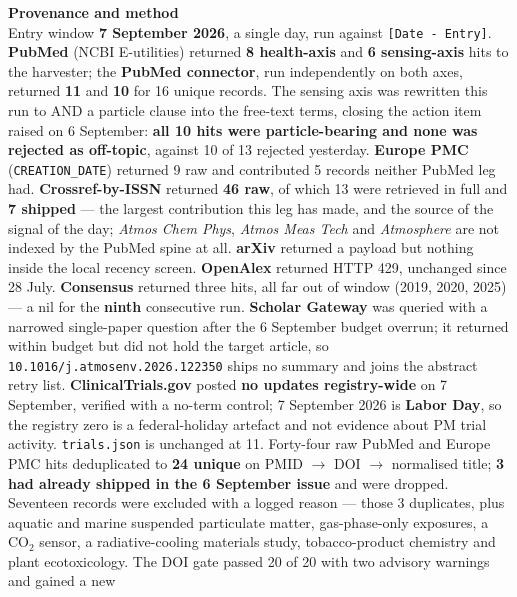 \documentclass[10pt]{article}
\begin{document}
\vspace{4mm}
\begin{keybox}
{\sffamily\bfseries\footnotesize\color{Deep}Provenance and method}\\[1.2mm]
{\fontsize{7.2}{8.8}\selectfont
Entry window \textbf{7 September 2026}, a single day, run against \texttt{[Date - Entry]}.
\textbf{PubMed} (NCBI E-utilities) returned \textbf{8 health-axis} and \textbf{6
sensing-axis} hits to the harvester; the \textbf{PubMed connector}, run independently on both
axes, returned \textbf{11} and \textbf{10} for 16 unique records. The sensing axis was
rewritten this run to AND a particle clause into the free-text terms, closing the action item
raised on 6 September: \textbf{all 10 hits were particle-bearing and none was rejected as
off-topic}, against 10 of 13 rejected yesterday. \textbf{Europe PMC}
(\texttt{CREATION\_DATE}) returned 9 raw and contributed 5 records neither PubMed leg had.
\textbf{Crossref-by-ISSN} returned \textbf{46 raw}, of which 13 were retrieved in full and
\textbf{7 shipped} --- the largest contribution this leg has made, and the source of the
signal of the day; \textit{Atmos Chem Phys}, \textit{Atmos Meas Tech} and \textit{Atmosphere}
are not indexed by the PubMed spine at all. \textbf{arXiv} returned a payload but nothing
inside the local recency screen. \textbf{OpenAlex} returned HTTP 429, unchanged since 28 July.
\textbf{Consensus} returned three hits, all far out of window (2019, 2020, 2025) --- a nil for
the \textbf{ninth} consecutive run. \textbf{Scholar Gateway} was queried with a narrowed
single-paper question after the 6 September budget overrun; it returned within budget but did
not hold the target article, so \texttt{10.1016/j.atmosenv.2026.122350} ships no summary and
joins the abstract retry list. \textbf{ClinicalTrials.gov} posted \textbf{no updates
registry-wide} on 7 September, verified with a no-term control; 7 September 2026 is
\textbf{Labor Day}, so the registry zero is a federal-holiday artefact and not evidence about
PM trial activity. \texttt{trials.json} is unchanged at 11.
Forty-four raw PubMed and Europe PMC hits deduplicated to \textbf{24 unique} on PMID $\to$
DOI $\to$ normalised title; \textbf{3 had already shipped in the 6 September issue} and were
dropped. Seventeen records were excluded with a logged reason --- those 3 duplicates, plus
aquatic and marine suspended particulate matter, gas-phase-only exposures, a CO$_2$ sensor, a
radiative-cooling materials study, tobacco-product chemistry and plant ecotoxicology.
The DOI gate passed 20 of 20 with two advisory warnings and gained a new
}
\end{keybox}
\end{document}
